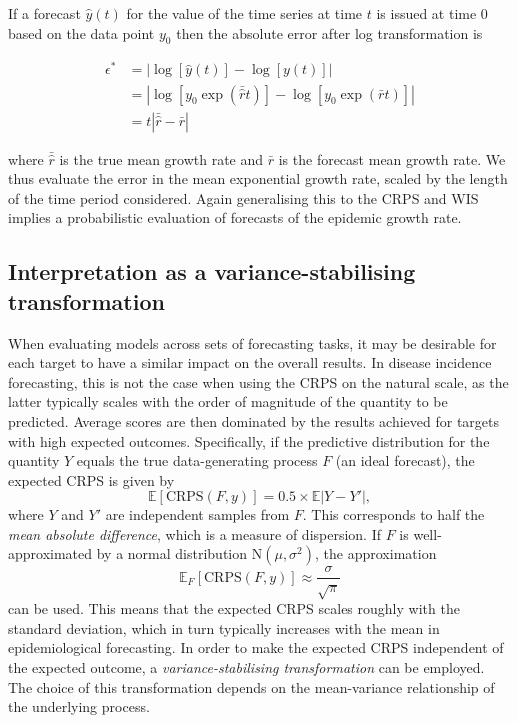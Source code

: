 \documentclass{article}
\begin{document}
If a forecast $\hat{y}(t)$ for the value of the time series at time $t$ is issued at time 0 based on the data point $y_0$ then the absolute error after log transformation is
%
\begin{linenomath*}
\begin{align*}
\epsilon^* &= \left| \log \left[ \hat{y}( t ) \right] - \log \left[ y ( t ) \right] \right|\\
           &= \left| \log \left[ y_0 \exp (\bar{\hat{r}} t ) \right] - \log \left[ y_0 \exp (\bar{r}t) \right] \right|\\
           &= t \left| \bar{\hat{r}} - \bar{r} \right|
\end{align*}
\end{linenomath*}
%
where $\bar{\hat{r}}$ is the true mean growth rate and $\bar{r}$ is the forecast mean growth rate. We thus evaluate the error in the mean exponential growth rate, scaled by the length of the time period considered. Again generalising this to the CRPS and WIS implies a probabilistic evaluation of forecasts of the epidemic growth rate.

\subsection{Interpretation as a variance-stabilising transformation}
\label{sec:methods:vst}

When evaluating models across sets of forecasting tasks, it may be desirable for each target to have a similar impact on the overall results. In disease incidence forecasting, this is not the case when using the CRPS on the natural scale, as the latter typically scales with the order of magnitude of the quantity to be predicted. Average scores are then dominated by the results achieved for targets with high expected outcomes. 
Specifically, if the predictive distribution for the quantity $Y$ equals the true data-generating process $F$ (an ideal forecast), the expected CRPS is given by \citep{gneitingStrictlyProperScoring2007}
$$
\mathbb{E}[\text{CRPS}(F, y)] = 0.5\times\mathbb{E}|Y - Y'|,
$$
where $Y$ and $Y'$ are independent samples from $F$. This corresponds to half the \textit{mean absolute difference}, which is a measure of dispersion. If $F$ is well-approximated by a normal distribution $\text{N}(\mu, \sigma^2)$, the approximation
$$
\mathbb{E}_F[\text{CRPS}(F, y)] \approx \frac{\sigma}{\sqrt{\pi}}
$$
can be used. This means that the expected CRPS scales roughly with the standard deviation, which in turn typically increases with the mean in epidemiological forecasting. In order to make the expected CRPS independent of the expected outcome, a \textit{variance-stabilising transformation} \citep[VST,][]{bartlettSquareRootTransformation1936} can be employed. The choice of this transformation depends on the mean-variance relationship of the underlying process. 
\end{document}
